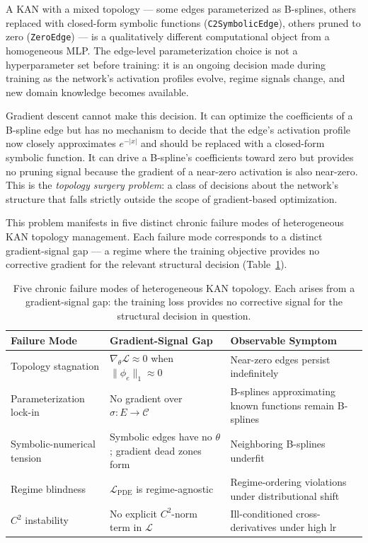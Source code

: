 \documentclass[11pt,a4paper]{article}
\begin{document}
A KAN with a mixed topology --- some edges parameterized as B-splines, others replaced
with closed-form symbolic functions (\texttt{C2SymbolicEdge}), others pruned to zero
(\texttt{ZeroEdge}) --- is a qualitatively different computational object from a
homogeneous MLP. The edge-level parameterization choice is not a hyperparameter set
before training: it is an ongoing decision made during training as the network's
activation profiles evolve, regime signals change, and new domain knowledge becomes
available.

Gradient descent cannot make this decision. It can optimize the coefficients of a
B-spline edge but has no mechanism to decide that the edge's activation profile now
closely approximates $e^{-|x|}$ and should be replaced with a closed-form symbolic
function. It can drive a B-spline's coefficients toward zero but provides no pruning
signal because the gradient of a near-zero activation is also near-zero. This is the
\emph{topology surgery problem}: a class of decisions about the network's structure
that falls strictly outside the scope of gradient-based optimization.

This problem manifests in five distinct chronic failure modes of heterogeneous KAN
topology management. Each failure mode corresponds to a distinct gradient-signal gap
--- a regime where the training objective provides no corrective gradient for the
relevant structural decision (Table~\ref{tab:problems}).

\begin{table}[ht]
\centering
\caption{Five chronic failure modes of heterogeneous KAN topology. Each arises from
a gradient-signal gap: the training loss provides no corrective signal for the
structural decision in question.}
\begin{tabular}{@{}p{3.2cm}p{4.5cm}p{4.5cm}@{}}
\toprule
Failure Mode & Gradient-Signal Gap & Observable Symptom \\
\midrule
Topology stagnation & $\nabla_\theta \mathcal{L} \approx 0$ when $\|\phi_e\|_1 \approx 0$ & Near-zero edges persist indefinitely \\
Parameterization lock-in & No gradient over $\sigma: E \to \mathcal{C}$ & B-splines approximating known functions remain B-splines \\
Symbolic-numerical tension & Symbolic edges have no $\theta$; gradient dead zones form & Neighboring B-splines underfit \\
Regime blindness & $\mathcal{L}_\text{PDE}$ is regime-agnostic & Regime-ordering violations under distributional shift \\
$C^2$ instability & No explicit $C^2$-norm term in $\mathcal{L}$ & Ill-conditioned cross-derivatives under high lr \\
\bottomrule
\end{tabular}
\label{tab:problems}
\end{table}
\end{document}
